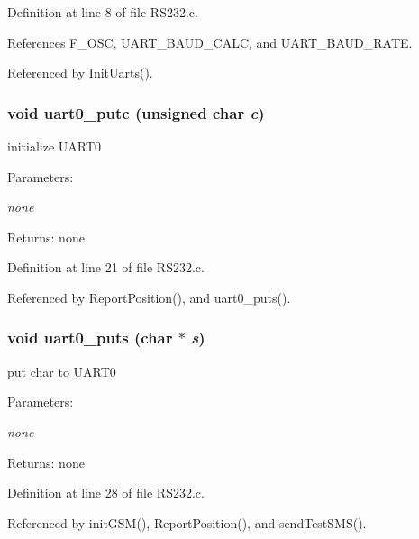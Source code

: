 Definition at line 8 of file RS232.c.

References F\_\-OSC, UART\_\-BAUD\_\-CALC, and UART\_\-BAUD\_\-RATE.

Referenced by InitUarts().
\subsubsection{\setlength{\rightskip}{0pt plus 5cm}void uart0\_\-putc (unsigned char {\em c})}\label{_r_s232_8c_a3e617e3f3c19057434cda6f1f113830}


initialize UART0 

\begin{Desc}
\item[Parameters:]
\begin{description}
\item[{\em none}]\end{description}
\end{Desc}
\begin{Desc}
\item[Returns:]none \end{Desc}


Definition at line 21 of file RS232.c.

Referenced by ReportPosition(), and uart0\_\-puts().
\subsubsection{\setlength{\rightskip}{0pt plus 5cm}void uart0\_\-puts (char $\ast$ {\em s})}\label{_r_s232_8c_5e327f0e98dcd2b2c73a158ed89947c7}


put char to UART0 

\begin{Desc}
\item[Parameters:]
\begin{description}
\item[{\em none}]\end{description}
\end{Desc}
\begin{Desc}
\item[Returns:]none \end{Desc}


Definition at line 28 of file RS232.c.

Referenced by initGSM(), ReportPosition(), and sendTestSMS().
